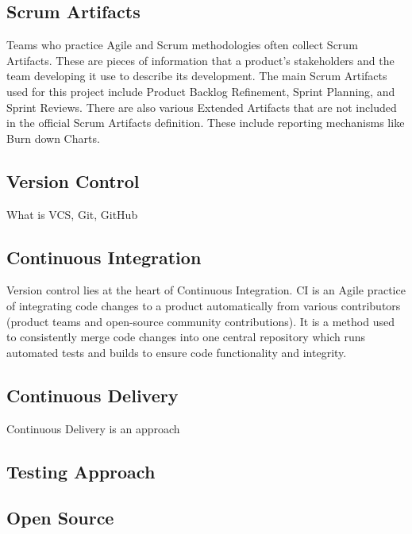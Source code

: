 \documentclass{article}
\begin{document}
\subsection{Scrum Artifacts} \label{artifacts}
Teams who practice Agile and Scrum methodologies often collect Scrum Artifacts. These are pieces of information that a product's stakeholders and the team developing it use to describe its development. The main Scrum Artifacts used for this project include Product Backlog Refinement, Sprint Planning, and Sprint Reviews. There are also various Extended Artifacts that are not included in the official Scrum Artifacts definition. These include reporting mechanisms like Burn down Charts.



\subsection{Version Control} \label{version-ctrl}
What is VCS, Git, GitHub 



\subsection{Continuous Integration} \label{ci}
Version control lies at the heart of Continuous Integration. CI is an Agile practice of integrating code changes to a product automatically from various contributors (product teams and open-source community contributions). It is a method used to consistently merge code changes into one central repository which runs automated tests and builds to ensure code functionality and integrity.   


 
\subsection{Continuous Delivery} \label{cd}
Continuous Delivery is an approach 



\subsection{Testing Approach}



\subsection{Open Source} \label{open-source}
\end{document}
